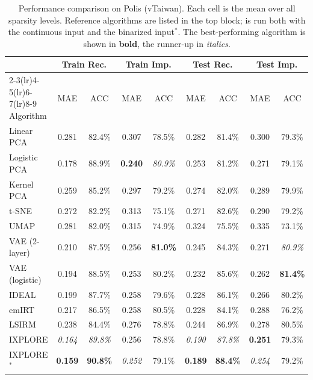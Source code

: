 \begin{table}[ht]
\centering
\caption{Performance comparison on Polis (vTaiwan). Each cell is the mean over all sparsity levels. Reference algorithms are listed in the top block; \IXPLORE is run both with the continuous input and the binarized input$^*$. The best-performing algorithm is shown in \textbf{bold}, the runner-up in \textit{italics}.}
\label{tab:baseline_polis}
\small
\begin{tabular}{lcccccccc}
\toprule
 & \multicolumn{2}{c}{Train Rec.} & \multicolumn{2}{c}{Train Imp.} & \multicolumn{2}{c}{Test Rec.} & \multicolumn{2}{c}{Test Imp.} \\
\cmidrule(lr){2-3}\cmidrule(lr){4-5}\cmidrule(lr){6-7}\cmidrule(lr){8-9}
Algorithm & MAE & ACC & MAE & ACC & MAE & ACC & MAE & ACC \\
\midrule
Linear PCA & 0.281 & 82.4\% & 0.307 & 78.5\% & 0.282 & 81.4\% & 0.300 & 79.3\% \\
Logistic PCA & 0.178 & 88.9\% & \textbf{0.240} & \textit{80.9\%} & 0.253 & 81.2\% & 0.271 & 79.1\% \\
Kernel PCA & 0.259 & 85.2\% & 0.297 & 79.2\% & 0.274 & 82.0\% & 0.289 & 79.9\% \\
t-SNE & 0.272 & 82.2\% & 0.313 & 75.1\% & 0.271 & 82.6\% & 0.290 & 79.2\% \\
UMAP & 0.281 & 82.0\% & 0.315 & 74.9\% & 0.324 & 75.5\% & 0.335 & 73.1\% \\
VAE (2-layer) & 0.210 & 87.5\% & 0.256 & \textbf{81.0\%} & 0.245 & 84.3\% & 0.271 & \textit{80.9\%} \\
VAE (logistic) & 0.194 & 88.5\% & 0.253 & 80.2\% & 0.232 & 85.6\% & 0.262 & \textbf{81.4\%} \\
IDEAL & 0.199 & 87.7\% & 0.258 & 79.6\% & 0.228 & 86.1\% & 0.266 & 80.2\% \\
emIRT & 0.217 & 86.5\% & 0.258 & 80.5\% & 0.228 & 84.1\% & 0.288 & 76.2\% \\
LSIRM & 0.238 & 84.4\% & 0.276 & 78.8\% & 0.244 & 86.9\% & 0.278 & 80.5\% \\
\midrule
IXPLORE & \textit{0.164} & \textit{89.8\%} & 0.256 & 78.8\% & \textit{0.190} & \textit{87.8\%} & \textbf{0.251} & 79.3\% \\
IXPLORE$^*$ & \textbf{0.159} & \textbf{90.8\%} & \textit{0.252} & 79.1\% & \textbf{0.189} & \textbf{88.4\%} & \textit{0.254} & 79.2\% \\
\bottomrule
\end{tabular}
\end{table}
